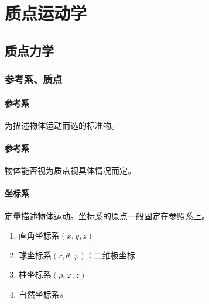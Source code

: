 \documentclass[
	12pt, %
	fleqn, %
	a4paper, %
]{myLegrandOrangeBook}
\begin{document}

\chapterspaceabove{6.75cm} %
\chapterspacebelow{7.25cm} %


\chapter{质点运动学}

\section{质点力学}

\subsection{参考系、质点}

\subsubsection*{参考系}

    为描述物体运动而选的标准物。

\subsubsection*{参考系}

    物体能否视为质点视具体情况而定。

\subsubsection*{坐标系}

    定量描述物体运动。坐标系的原点一般固定在参照系上。

    \begin{enumerate}
        \item 直角坐标系\(\left(x,y,z\right)\)
        \item 球坐标系\(\left(r,\theta,\varphi\right)\)：二维极坐标
        \item 柱坐标系\(\left(\rho,\varphi,z\right)\)
        \item 自然坐标系\(s\)
    \end{enumerate}
\end{document}
